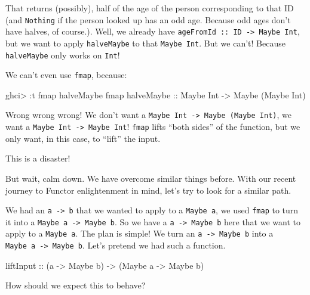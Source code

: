 \documentclass[]{article}
\newenvironment{Shaded}{}{}
\newcommand{\DataTypeTok}[1]{\textcolor[rgb]{0.56,0.13,0.00}{{#1}}}
\newcommand{\OtherTok}[1]{\textcolor[rgb]{0.00,0.44,0.13}{{#1}}}
\newcommand{\FunctionTok}[1]{\textcolor[rgb]{0.02,0.16,0.49}{{#1}}}
\newcommand{\NormalTok}[1]{{#1}}
\begin{document}
That returns (possibly), half of the age of the person corresponding to
that ID (and \texttt{Nothing} if the person looked up has an odd age.
Because odd ages don't have halves, of course.). Well, we already have
\texttt{ageFromId\ ::\ ID\ -\textgreater{}\ Maybe\ Int}, but we want to
apply \texttt{halveMaybe} to that \texttt{Maybe\ Int}. But we can't!
Because \texttt{halveMaybe} only works on \texttt{Int}!

We can't even use \texttt{fmap}, because:

\begin{Shaded}
\begin{Highlighting}[]
\NormalTok{ghci}\FunctionTok{>} \FunctionTok{:}\NormalTok{t fmap halveMaybe}
\NormalTok{fmap}\OtherTok{ halveMaybe ::} \DataTypeTok{Maybe} \DataTypeTok{Int} \OtherTok{->} \DataTypeTok{Maybe} \NormalTok{(}\DataTypeTok{Maybe} \DataTypeTok{Int}\NormalTok{)}
\end{Highlighting}
\end{Shaded}

Wrong wrong wrong! We don't want a
\texttt{Maybe\ Int\ -\textgreater{}\ Maybe\ (Maybe\ Int)}, we want a
\texttt{Maybe\ Int\ -\textgreater{}\ Maybe\ Int}! \texttt{fmap} lifts
``both sides'' of the function, but we only want, in this case, to
``lift'' the input.

This is a disaster!

But wait, calm down. We have overcome similar things before. With our
recent journey to Functor enlightenment in mind, let's try to look for a
similar path.

We had an \texttt{a\ -\textgreater{}\ b} that we wanted to apply to a
\texttt{Maybe\ a}, we used \texttt{fmap} to turn it into a
\texttt{Maybe\ a\ -\textgreater{}\ Maybe\ b}. So we have a
\texttt{a\ -\textgreater{}\ Maybe\ b} here that we want to apply to a
\texttt{Maybe\ a}. The plan is simple! We turn an
\texttt{a\ -\textgreater{}\ Maybe\ b} into a
\texttt{Maybe\ a\ -\textgreater{}\ Maybe\ b}. Let's pretend we had such
a function.

\begin{Shaded}
\begin{Highlighting}[]
\OtherTok{liftInput ::} \NormalTok{(a }\OtherTok{->} \DataTypeTok{Maybe} \NormalTok{b) }\OtherTok{->} \NormalTok{(}\DataTypeTok{Maybe} \NormalTok{a }\OtherTok{->} \DataTypeTok{Maybe} \NormalTok{b)}
\end{Highlighting}
\end{Shaded}

How should we expect this to behave?
\end{document}

